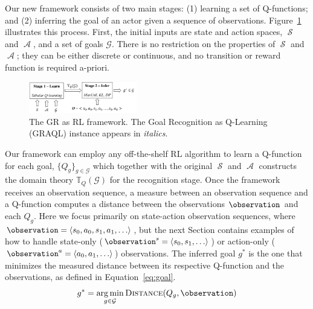 \documentclass[letterpaper]{article} %
\DeclareMathOperator{\statespace}{\mathcal{S}}
\DeclareMathOperator{\actionspace}{\mathcal{A}}
\DeclareMathOperator*{\argmin}{arg\,min}
\providecommand\theory{\mathbb{T}}
\providecommand\goals{\mathcal{G}}
\begin{document}
Our new framework consists of two main stages: (1) learning a set of Q-functions; and (2) inferring the goal of an actor given a sequence of observations. 
Figure~\ref{fig:RL4GR} illustrates this process. 
First, the initial inputs are state and action spaces, $\statespace$ and $\actionspace$, and a set of goals $\goals$. 
%
There is no restriction on the properties of $\statespace$ and $\actionspace$; they can be either discrete or continuous, and no transition or reward function is required a-priori. %
%
\begin{figure}[t]
    \centering
    \includegraphics[width=0.42\textwidth]{Figures/RL4GR.pdf}
    \caption{The GR as RL framework. The Goal Recognition as Q-Learning (GRAQL) instance appears in \textit{italics}.}
    \label{fig:RL4GR}
\end{figure}
%
Our framework can employ any off-the-shelf RL algorithm to learn a Q-function for each goal, $\{Q_g\}_{g \in \goals}$ which together with the original $\statespace$ and $\actionspace$ constructs the domain theory $\theory_{Q}(\goals)$ for the recognition stage. 
Once the framework receives an observation sequence, a measure between an observation sequence and a Q-function computes a distance between the observations $\observation$ and each $Q_g$. 
Here we focus primarily on state-action observation sequences, where $\observation = \langle s_0, a_0, s_1, a_1, \ldots \rangle$, but the next Section contains examples of how to handle state-only ($\observation^s = \langle s_0, s_1,\ldots \rangle$) or action-only ($\observation^a = \langle a_0, a_1,\ldots \rangle$) observations.
The inferred goal $g^*$ is the one that minimizes the measured distance between its respective Q-function and the observations, as defined in Equation~\ref{eq:goal}. 
%
%
\begin{equation}
\label{eq:goal}
    g^* = \argmin_{g \in \goals} {\textsc{Distance}(Q_g, \observation)}
\end{equation}
\end{document}
